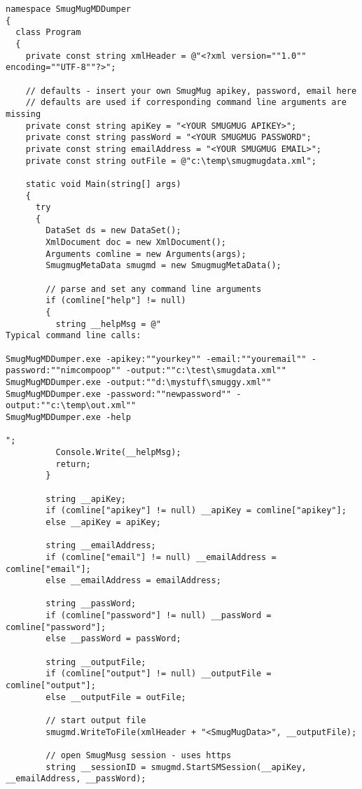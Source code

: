 \lstset{style=sharpc, label=lst:scr323X0}
\begin{lstlisting}
namespace SmugMugMDDumper
{
  class Program
  {
    private const string xmlHeader = @"<?xml version=""1.0"" encoding=""UTF-8""?>";

    // defaults - insert your own SmugMug apikey, password, email here
    // defaults are used if corresponding command line arguments are missing
    private const string apiKey = "<YOUR SMUGMUG APIKEY>";
    private const string passWord = "<YOUR SMUGMUG PASSWORD";
    private const string emailAddress = "<YOUR SMUGMUG EMAIL>";
    private const string outFile = @"c:\temp\smugmugdata.xml";

    static void Main(string[] args)
    {
      try
      {
        DataSet ds = new DataSet();
        XmlDocument doc = new XmlDocument();
        Arguments comline = new Arguments(args);
        SmugmugMetaData smugmd = new SmugmugMetaData();

        // parse and set any command line arguments
        if (comline["help"] != null)
        {
          string __helpMsg = @"
Typical command line calls:

SmugMugMDDumper.exe -apikey:""yourkey"" -email:""youremail"" -password:""nimcompoop"" -output:""c:\test\smugdata.xml""
SmugMugMDDumper.exe -output:""d:\mystuff\smuggy.xml""
SmugMugMDDumper.exe -password:""newpassword"" -output:""c:\temp\out.xml""
SmugMugMDDumper.exe -help

";
          Console.Write(__helpMsg);
          return;
        }

        string __apiKey;
        if (comline["apikey"] != null) __apiKey = comline["apikey"];
        else __apiKey = apiKey;

        string __emailAddress;
        if (comline["email"] != null) __emailAddress = comline["email"];
        else __emailAddress = emailAddress;

        string __passWord;
        if (comline["password"] != null) __passWord = comline["password"];
        else __passWord = passWord;

        string __outputFile;
        if (comline["output"] != null) __outputFile = comline["output"];
        else __outputFile = outFile;

        // start output file
        smugmd.WriteToFile(xmlHeader + "<SmugMugData>", __outputFile);

        // open SmugMusg session - uses https
        string __sessionID = smugmd.StartSMSession(__apiKey, __emailAddress, __passWord);


\end{lstlisting}
